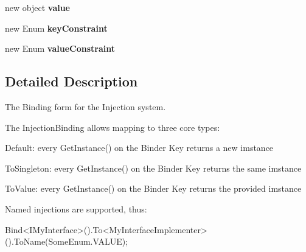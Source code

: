 \begin{DoxyCompactItemize}
\item 
\hypertarget{interfacestrange_1_1extensions_1_1injector_1_1api_1_1_i_injection_binding_a80844fa673a551d4c2efc878e248620f}{new object {\bfseries value}}\label{interfacestrange_1_1extensions_1_1injector_1_1api_1_1_i_injection_binding_a80844fa673a551d4c2efc878e248620f}

\item 
\hypertarget{interfacestrange_1_1extensions_1_1injector_1_1api_1_1_i_injection_binding_a6f0003461d50b55cd513b86a4c2de1b1}{new Enum {\bfseries key\-Constraint}}\label{interfacestrange_1_1extensions_1_1injector_1_1api_1_1_i_injection_binding_a6f0003461d50b55cd513b86a4c2de1b1}

\item 
\hypertarget{interfacestrange_1_1extensions_1_1injector_1_1api_1_1_i_injection_binding_a0799df8c8f2e3f35ca4d45b31becba03}{new Enum {\bfseries value\-Constraint}}\label{interfacestrange_1_1extensions_1_1injector_1_1api_1_1_i_injection_binding_a0799df8c8f2e3f35ca4d45b31becba03}

\end{DoxyCompactItemize}


\subsection{Detailed Description}
The Binding form for the Injection system. 

The Injection\-Binding allows mapping to three core types\-: 
\begin{DoxyItemize}
\item Default\-: every {\ttfamily Get\-Instance()} on the Binder Key returns a new imstance 
\item To\-Singleton\-: every {\ttfamily Get\-Instance()} on the Binder Key returns the same imstance 
\item To\-Value\-: every {\ttfamily Get\-Instance()} on the Binder Key returns the provided imstance 
\end{DoxyItemize}

Named injections are supported, thus\-: \begin{DoxyVerb}Bind<IMyInterface>().To<MyInterfaceImplementer>().ToName(SomeEnum.VALUE);
\end{DoxyVerb}


